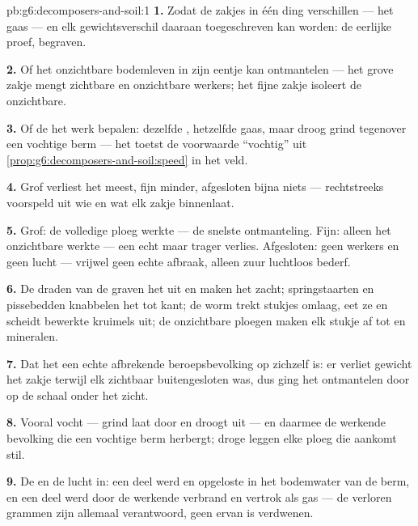 \begin{solution}{pb:g6:decomposers-and-soil:1}
\textbf{1.} Zodat de zakjes in één ding verschillen --- het gaas --- en
elk gewichtsverschil daaraan toegeschreven kan worden: de eerlijke proef,
begraven.

\textbf{2.} Of het onzichtbare bodemleven in zijn eentje  kan
ontmantelen --- het grove zakje mengt zichtbare en onzichtbare werkers;
het fijne zakje isoleert de onzichtbare.

\textbf{3.} Of de  het werk bepalen: dezelfde ,
hetzelfde gaas, maar droog grind tegenover een vochtige berm --- het
toetst de voorwaarde ``vochtig'' uit
\cref{prop:g6:decomposers-and-soil:speed} in het veld.

\textbf{4.} Grof verliest het meest, fijn minder, afgesloten bijna niets
--- rechtstreeks voorspeld uit wie en wat elk zakje binnenlaat.

\textbf{5.} Grof: de volledige ploeg werkte --- de snelste ontmanteling.
Fijn: alleen het onzichtbare werkte --- een echt maar trager verlies.
Afgesloten: geen werkers en geen lucht --- vrijwel geen echte afbraak,
alleen zuur luchtloos bederf.

\textbf{6.} De draden van de  graven het  uit en maken het
zacht; springstaarten en pissebedden knabbelen het tot kant; de worm
trekt stukjes omlaag, eet ze en scheidt bewerkte kruimels uit; de
onzichtbare ploegen maken elk stukje af tot  en mineralen.

\textbf{7.} Dat het een echte afbrekende beroepsbevolking op zichzelf is:
er verliet gewicht het zakje terwijl elk zichtbaar  buitengesloten
was, dus ging het ontmantelen door op de schaal onder het zicht.

\textbf{8.} Vooral vocht --- grind laat door en droogt uit --- en
daarmee de werkende bevolking die een vochtige berm herbergt; droge
 leggen elke ploeg die aankomt stil.

\textbf{9.} De  en de lucht in: een deel werd  en opgeloste
 in het bodemwater van de berm, en een deel werd door de
werkende  verbrand en vertrok als gas --- de verloren grammen
zijn allemaal verantwoord, geen ervan is verdwenen.


\end{solution}
